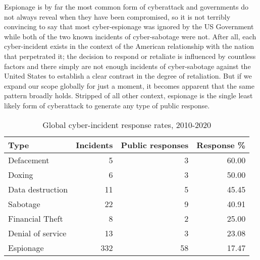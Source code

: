 \documentclass[12pt]{extarticle}
\begin{document}
Espionage is by far the most common form of cyberattack and governments do not always reveal when they have been compromised, so it is not terribly convincing to say that most cyber-espionage was ignored by the US Government while both of the two known incidents of cyber-sabotage were not. After all, each cyber-incident exists in the context of the American relationship with the nation that perpetrated it; the decision to respond or retaliate is influenced by countless factors and there simply are not enough incidents of cyber-sabotage against the United States to establish a clear contrast in the degree of retaliation. But if we expand our scope globally for just a moment, it becomes apparent that the same pattern broadly holds. Stripped of all other context, espionage is the single least likely form of cyberattack to generate any type of public response.

\begin{table}[ht]
\centering
\setlength{\extrarowheight}{2pt}
\small
\begin{tabular}{lrrr}
  \hline
Type & Incidents & Public responses & Response \% \\
  \hline
Defacement &   5 &   3 & 60.00 \\
  Doxing &   6 &   3 & 50.00 \\
  Data destruction &  11 &   5 & 45.45 \\
  Sabotage &  22 &   9 & 40.91 \\
  Financial Theft &   8 &   2 & 25.00 \\
  Denial of service &  13 &   3 & 23.08 \\
  Espionage & 332 &  58 & 17.47 \\
   \hline
\end{tabular}
\caption{Global cyber-incident response rates, 2010-2020}
\label{response-pct}
\end{table}
\end{document}
